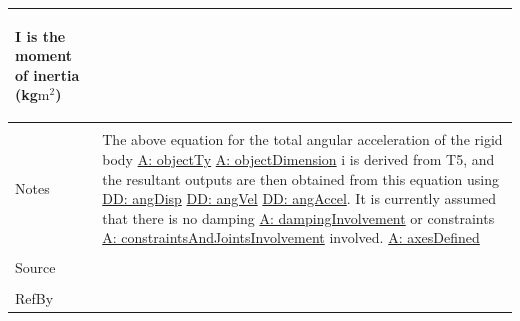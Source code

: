 \documentclass[12pt]{article}
\begin{document}
\begin{minipage}{\textwidth}
\begin{tabular}{p{} p{}}
\begin{symbDescription}
              \item{$\mathbf{I}$ is the moment of inertia (kg$\text{m}^{2}$)}
              \end{symbDescription}
\\ \midrule \\
Notes & The above equation for the total angular acceleration of the rigid body \hyperref[A:objectTy]{A: objectTy} \hyperref[A:objectDimension]{A: objectDimension} i is derived from T5, and the resultant outputs are then obtained from this equation using \hyperref[DD:angDisp]{DD: angDisp} \hyperref[DD:angVel]{DD: angVel} \hyperref[DD:angAccel]{DD: angAccel}. It is currently assumed that there is no damping \hyperref[A:dampingInvolvement]{A: dampingInvolvement} or constraints \hyperref[A:constraintsAndJointsInvolvement]{A: constraintsAndJointsInvolvement} involved. \hyperref[A:axesDefined]{A: axesDefined}
\\ \midrule \\
Source & 
\\ \midrule \\
RefBy & 
\\ \bottomrule \end{tabular}
\end{minipage}\\
~\newline
\end{document}
